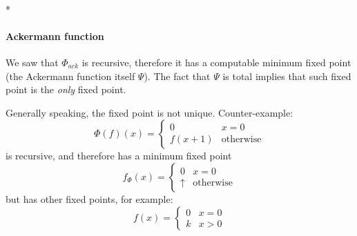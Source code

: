 \mbox{}\\*
\paragraph{\textbf{Ackermann function}}
We saw that $\Phi_{ack}$ is recursive, therefore it has a computable
minimum fixed point (the Ackermann function itself $\Psi$). The fact
that $\Psi$ is total implies that such fixed point is the
\emph{only} fixed point.


\begin{observation}
  Generally speaking, the fixed point is not unique. Counter-example:
  \[
    \Phi(f)(x) = \begin{cases}
      0 & x=0 \\
      f(x+1) & \mbox{otherwise}
    \end{cases}
  \]
  is recursive, and therefore has a minimum fixed point
  \[
    f_\Phi(x) = \begin{cases}
      0 & x=0 \\
      \uparrow & \mbox{otherwise}
    \end{cases}
  \]
  but has other fixed points, for example:
  \[
    f(x) = \begin{cases}
      0 & x=0 \\
      k & x>0
    \end{cases}
  \]
\end{observation}
